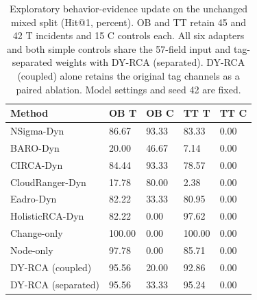 \begin{table}[tbp]
\caption{Exploratory behavior-evidence update on the unchanged mixed split (Hit@1, percent). OB and TT retain 45 and 42 T incidents and 15 C controls each. All six adapters and both simple controls share the 57-field input and tag-separated weights with DY-RCA (separated). DY-RCA (coupled) alone retains the original tag channels as a paired ablation. Model settings and seed 42 are fixed.}
\label{tab:behavior_update}
\resultstable
\begin{tabularx}{\linewidth}{@{}lYYYY@{}}
\toprule
Method & OB T & OB C & TT T & TT C\\
\midrule
NSigma-Dyn & 86.67 & 93.33 & 83.33 & 0.00\\
BARO-Dyn & 20.00 & 46.67 & 7.14 & 0.00\\
CIRCA-Dyn & 84.44 & 93.33 & 78.57 & 0.00\\
CloudRanger-Dyn & 17.78 & 80.00 & 2.38 & 0.00\\
Eadro-Dyn & 82.22 & 33.33 & 80.95 & 0.00\\
HolisticRCA-Dyn & 82.22 & 0.00 & 97.62 & 0.00\\
Change-only & 100.00 & 0.00 & 100.00 & 0.00\\
Node-only & 97.78 & 0.00 & 85.71 & 0.00\\
DY-RCA (coupled) & 95.56 & 20.00 & 92.86 & 0.00\\
DY-RCA (separated) & 95.56 & 33.33 & 95.24 & 0.00\\
\bottomrule
\end{tabularx}
\end{table}

